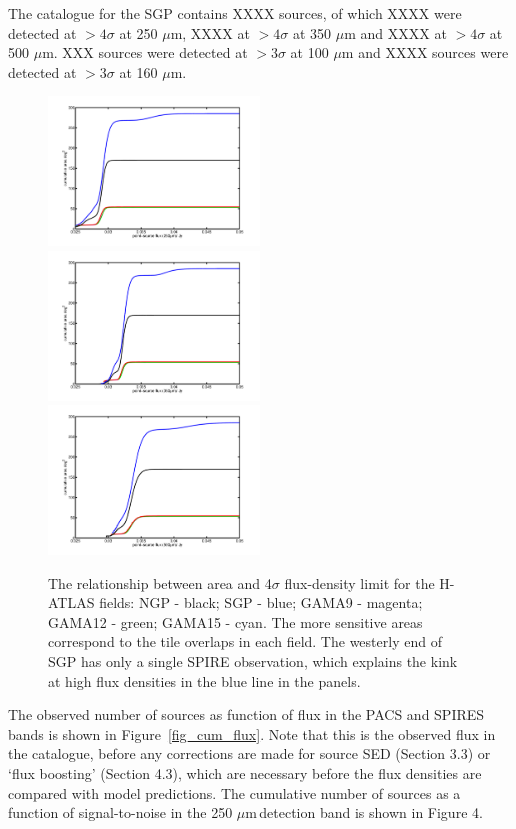 \documentclass[useAMS,usenatbib]{mn2e}
\def\mic{ $\mu $m\,}
\begin{document}
The catalogue for the SGP contains XXXX sources, of which XXXX  were detected
at $>4\sigma$ at 250 $\mu$m, XXXX at $>4\sigma$ at 350 $\mu$m and XXXX  at
$>4\sigma$ at 500 $\mu$m. 
XXX sources were detected
at $>3\sigma$ at 100 $\mu$m and XXXX sources were detected at 
$>3\sigma$ at 160 $\mu$m.

\begin{figure} %
\includegraphics[width=0.5\textwidth]{flux_area_250.pdf}
\includegraphics[width=0.5\textwidth]{flux_area_350.pdf}
\includegraphics[width=0.5\textwidth]{flux_area_500.pdf}
\caption{The
relationship between area and 4$\sigma$ flux-density limit
for the
  H-ATLAS fields: NGP - black; SGP - blue; GAMA9 - magenta; GAMA12 - green;
  GAMA15 - cyan.  The more sensitive areas correspond to the
tile overlaps in each field.
The westerly end of SGP has only a single SPIRE observation,
which explains the kink at high flux densities
in the blue line in the panels.}

\label{fig_areas}
\end{figure}

The observed number of sources as  function of flux in the PACS and
SPIRES bands is shown in Figure~\ref{fig_cum_flux}. 
Note that this is the observed flux in the catalogue, before any
corrections are made for source SED (Section 3.3) or `flux boosting'
(Section 4.3), which are necessary
before the flux densities are compared with model predictions.
The cumulative number of sources as a function of signal-to-noise in
the 250\mic detection band is shown in Figure 4.
\end{document}
